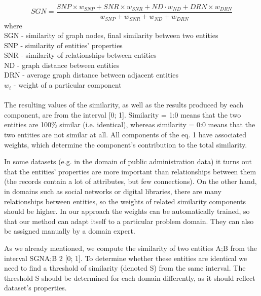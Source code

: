 \documentclass{llncs}
\begin{document}
\begin {equation}
SGN=\frac{SNP\times w_{SNP}+SNR\times w_{SNR}+ND \cdot  w_{ND}+DRN\times w_{DRN}}{w_{SNP} + w_{SNR} + w_{ND} + w_{DRN}}
\label{rov1}
\end {equation}
where\\
\newline
SGN - similarity of graph nodes, final similarity between two entities\\
SNP - similarity of entities' properties\\
SNR - similarity of relationships between entities\\
ND - graph distance between entities\\
DRN - average graph distance between adjacent entities\\
$w_i$ - weight of a particular component\\
\vspace{5mm} \\
The resulting values of the similarity, as well as the results produced by each
component, are from the interval [0; 1]. Similarity = 1:0 means that the two
entities are 100\%  similar (i.e. identical), whereas similarity = 0:0 means that the
two entities are not similar at all. All components of the eq. 1 have associated
weights, which determine the component's contribution to the total similarity.

In some datasets (e.g. in the domain of public administration data) it turns
out that the entities' properties are more important than relationships between
them (the records contain a lot of attributes, but few connections). On the other
hand, in domains such as social networks or digital libraries, there are many
relationships between entities, so the weights of related similarity components
should be higher. In our approach the weights can be automatically trained, so
that our method can adapt itself to a particular problem domain. They can also
be assigned manually by a domain expert.

As we already mentioned, we compute the similarity of two entities A;B from
the interval SGNA;B 2 [0; 1]. To determine whether these entities are identical
we need to find a threshold of similarity (denoted S) from the same interval.
The threshold S should be determined for each domain differently, as it should
reflect dataset's properties.
\end{document}
